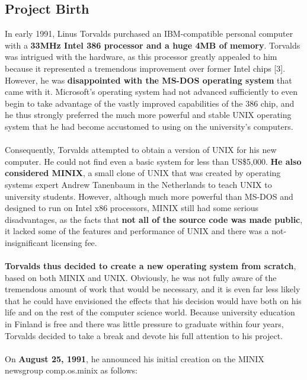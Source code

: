 \documentclass[11pt]{article}
\begin{document}
\subsection{Project Birth} 
In early 1991, Linus Torvalds purchased an IBM-compatible personal computer with a \textbf{33MHz Intel 386 processor and a huge 4MB of memory}. Torvalds was intrigued with the hardware, as this processor greatly appealed to him because it represented a tremendous improvement over former Intel chips [3]. However, he was \textbf{disappointed with the MS-DOS operating system} that came with it. Microsoft's operating system had not advanced sufficiently to even begin to take advantage of the vastly improved capabilities of the 386 chip, and he thus strongly preferred the much more powerful and stable UNIX operating system that he had become accustomed to using on the university's computers.\\
\\
Consequently, Torvalds attempted to obtain a version of UNIX for his new computer. He could not find even a basic system for less than US\$5,000. \textbf{He also considered MINIX}, a small clone of UNIX that was created by operating systems expert Andrew Tanenbaum in the Netherlands to teach UNIX to university students. However, although much more powerful than MS-DOS and designed to run on Intel x86 processors, MINIX still had some serious disadvantages, as the facts that \textbf{not all of the source code was made public}, it lacked some of the features and performance of UNIX and there was a not-insignificant licensing fee.\\
\\
\textbf{Torvalds thus decided to create a new operating system from scratch}, based on both MINIX and UNIX. Obviously, he was not fully aware of the tremendous amount of work that would be necessary, and it is even far less likely that he could have envisioned the effects that his decision would have both on his life and on the rest of the computer science world. Because university education in Finland is free and there was little pressure to graduate within four years, Torvalds decided to take a break and devote his full attention to his project.\\
\\
On \textbf{August 25, 1991}, he announced his initial creation on the MINIX newsgroup comp.os.minix as follows:
\end{document}
